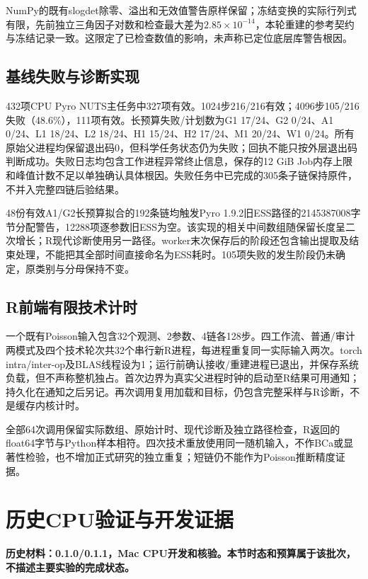 \documentclass[UTF8,fontset=fandol,zihao=-4]{ctexart}
\begin{document}
NumPy的既有slogdet除零、溢出和无效值警告原样保留；冻结变换的实际行列式有限，先前独立三角因子对数和检查最大差为$2.85\times10^{-14}$，本轮重建的参考契约与冻结记录一致。这限定了已检查数值的影响，未声称已定位底层库警告根因。

\subsection{基线失败与诊断实现}
432项CPU Pyro NUTS主任务中327项有效。1024步216/216有效；4096步105/216失败（48.6\%），111项有效。长预算失败/计划数为G1 17/24、G2 0/24、A1 0/24、L1 18/24、L2 18/24、H1 15/24、H2 17/24、M1 20/24、W1 0/24。所有原始父进程均保留退出码0，但科学任务状态仍为失败；回执不能只按外层退出码判断成功。失败日志均包含工作进程异常终止信息，保存的12 GiB Job内存上限和峰值计数不足以单独确认具体根因。失败任务中已完成的305条子链保持原件，不并入完整四链后验结果。

48份有效A1/G2长预算拟合的192条链均触发Pyro 1.9.2旧ESS路径的2145387008字节分配警告，12288项逐参数旧ESS为空。该实现的相关中间数组随保留长度呈二次增长；R现代诊断使用另一路径。worker末次保存后的阶段还包含输出提取及结束处理，不能把其全部时间直接命名为ESS耗时。105项失败的发生阶段仍未确定，原类别与分母保持不变。



\subsection{R前端有限技术计时}
一个既有Poisson输入包含32个观测、2参数、4链各128步。四工作流、普通/审计两模式及四个技术轮次共32个串行新R进程，每进程重复同一实际输入两次。torch intra/inter-op及BLAS线程设为1；运行前确认接收/重建进程已退出，并保存系统负载，但不声称整机独占。首次边界为真实父进程时钟的启动至R结果可用通知；持久化在通知之后另记。再次调用复用加载和目标，仍包含完整采样与R诊断，不是缓存内核计时。



全部64次调用保留实际数组、原始计时、现代诊断及独立路径检查，R返回的float64字节与Python样本相符。四次技术重放使用同一随机输入，不作BCa或显著性检验，也不增加正式研究的独立重复；短链仍不能作为Poisson推断精度证据。



\clearpage
\section{历史CPU验证与开发证据}
\noindent\textbf{历史材料：0.1.0/0.1.1，Mac CPU开发和核验。本节时态和预算属于该批次，不描述主要实验的完成状态。}
\end{document}
